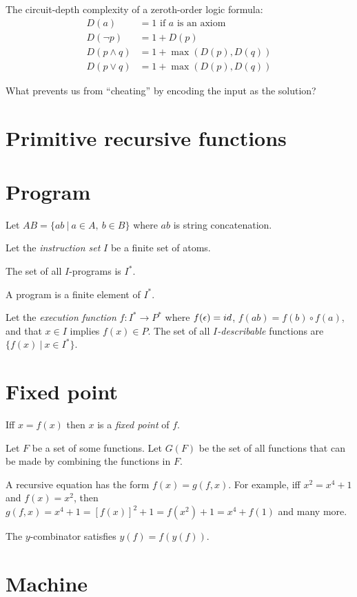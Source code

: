 The circuit-depth complexity of a zeroth-order logic formula:
\begin{align*}
    D(a) &= 1 \text{ if \(a\) is an axiom}
    \\
    D(\neg p) &= 1 + D(p)
    \\
    D(p \wedge q) &= 1 + \max(D(p),D(q))
    \\
    D(p \vee q) &= 1 + \max(D(p),D(q))
\end{align*}

What prevents us from ``cheating'' by encoding the input as the solution?

\section{Primitive recursive functions}

\section{Program}

Let \(AB = \{ ab ~|~ a \in A, ~ b \in B \}\)
where \(ab\) is string concatenation.

Let the \emph{instruction set} \(I\) be a finite set of atoms.

The set of all \(I\)-programs is \(I^*\).

A program is a finite element of \(I^*\).

Let the \emph{execution function} \(f : I^* \to P^*\)
where
\(f(\epsilon) = id\),
\(f(ab) = f(b) \circ f(a)\),
and that \(x \in I\) implies \(f(x) \in P\).
The set of all \emph{\(I\)-describable} functions are \(\{ f(x) ~|~ x \in I^* \}\).

\section{Fixed point}

Iff \(x = f(x)\) then \(x\) is a \emph{fixed point} of \(f\).

Let \(F\) be a set of some functions.
Let \(G(F)\) be the set of all functions that can be made by combining the functions in \(F\).

A recursive equation has the form \(f(x) = g(f,x)\).
For example, iff \(x^2 = x^4 + 1\) and \(f(x) = x^2\), then \(g(f,x) = x^4 + 1 = [f(x)]^2 + 1 = f(x^2) + 1 = x^4 + f(1)\)
and many more.

The \(y\)-combinator satisfies \(y(f) = f(y(f))\).

\section{Machine}

